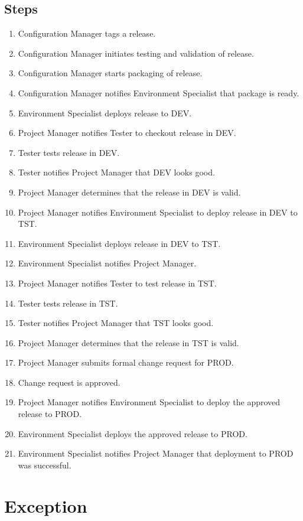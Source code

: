 \documentclass[12pt,notitlepage]{article}
\begin{document}
\subsection{Steps}
\begin{enumerate}
  \item Configuration Manager tags a release.
  \item Configuration Manager initiates testing and validation of release.
  \item Configuration Manager starts packaging of release.
  \item Configuration Manager notifies Environment Specialist that package is ready.
  \item Environment Specialist deploys release to DEV.
  \item Project Manager notifies Tester to checkout release in DEV.
  \item Tester tests release in DEV.
  \item Tester notifies Project Manager that DEV looks good.
  \item Project Manager determines that the release in DEV is valid.
  \item Project Manager notifies Environment Specialist to deploy release in DEV to TST.
  \item Environment Specialist deploys release in DEV to TST.
  \item Environment Specialist notifies Project Manager.
  \item Project Manager notifies Tester to test release in TST.
  \item Tester tests release in TST.
  \item Tester notifies Project Manager that TST looks good.
  \item Project Manager determines that the release in TST is valid.
  \item Project Manager submits formal change request for PROD.
  \item Change request is approved.
  \item Project Manager notifies Environment Specialist to deploy the approved release to PROD.
  \item Environment Specialist deploys the approved release to PROD.
  \item Environment Specialist notifies Project Manager that deployment to PROD was successful.
\end{enumerate}

\section{Exception}
\end{document}
